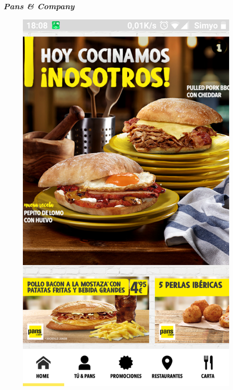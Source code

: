 \documentclass[twoside]{report}
\begin{document}
\subsubsection{\textit{Pans \& Company}}

\begin{figure}[H]
\begin{center}
\includegraphics[scale=0.25]{images/restaurantes/pans0.png}

\end{center}
\end{figure}
\end{document}
